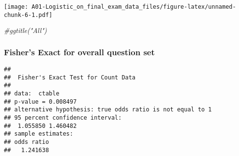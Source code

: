 \documentclass[]{article}
\newenvironment{Shaded}{\begin{snugshade}}{\end{snugshade}}
\newcommand{\KeywordTok}[1]{\textcolor[rgb]{0.13,0.29,0.53}{\textbf{#1}}}
\newcommand{\DecValTok}[1]{\textcolor[rgb]{0.00,0.00,0.81}{#1}}
\newcommand{\CharTok}[1]{\textcolor[rgb]{0.31,0.60,0.02}{#1}}
\newcommand{\StringTok}[1]{\textcolor[rgb]{0.31,0.60,0.02}{#1}}
\newcommand{\CommentTok}[1]{\textcolor[rgb]{0.56,0.35,0.01}{\textit{#1}}}
\newcommand{\OperatorTok}[1]{\textcolor[rgb]{0.81,0.36,0.00}{\textbf{#1}}}
\newcommand{\NormalTok}[1]{#1}
\begin{document}
\texttt{[image: A01-Logistic\_on\_final\_exam\_data\_files/figure-latex/unnamed-chunk-6-1.pdf]}

\begin{Shaded}
\begin{Highlighting}[]
  \CommentTok{#ggtitle("All")}
\end{Highlighting}
\end{Shaded}

\subsubsection{Fisher's Exact for overall question
set}\label{fishers-exact-for-overall-question-set}

\begin{Shaded}
\end{Shaded}

\begin{verbatim}
## 
##  Fisher's Exact Test for Count Data
## 
## data:  ctable
## p-value = 0.008497
## alternative hypothesis: true odds ratio is not equal to 1
## 95 percent confidence interval:
##  1.055850 1.460482
## sample estimates:
## odds ratio 
##   1.241638
\end{verbatim}

\begin{Shaded}
\end{Shaded}
\end{document}
